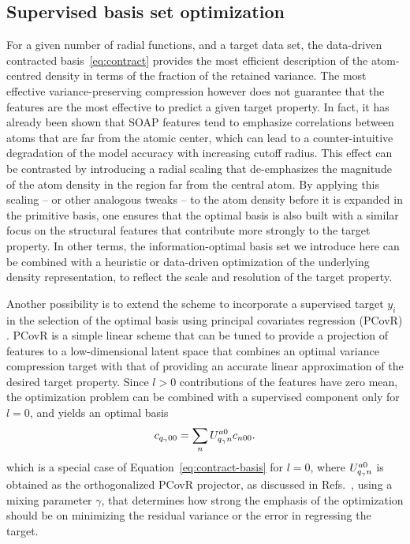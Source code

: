 \subsection{Supervised basis set optimization}
For a given number of radial functions, and a target data set, the data-driven contracted basis~\eqref{eq:contract} provides the most efficient description of the atom-centred density in terms of the fraction of the retained variance.
The most effective variance-preserving compression however does not guarantee that the features are the most effective to predict a given target property.
In fact, it has already been shown that SOAP features tend to emphasize correlations between atoms that are far from the atomic center, which can lead to a counter-intuitive degradation of the model accuracy with increasing cutoff radius\cite{bart+17sa,will+18pccp}. 
This effect can be contrasted by introducing a radial scaling\cite{huan-vonl16jcp,will+18pccp} that de-emphasizes the magnitude of the atom density in the region far from the central atom. 
By applying this scaling -- or other analogous tweaks\cite{caro2019optimizing} -- to the atom density before it is expanded in the primitive basis, one ensures that the optimal basis is also built with a similar focus on the structural features that contribute more strongly to the target property.
In other terms, the information-optimal basis set we introduce here can be combined with a heuristic or data-driven optimization of the underlying density representation, to reflect the scale and resolution of the target property.


Another possibility is to extend the scheme to incorporate a supervised target $y_i$ in the selection of the optimal basis using principal covariates regression (PCovR) \cite{dejo-kier92cils,helf+20mlst}.
PCovR is a simple linear scheme that can be tuned to provide a projection of features to a low-dimensional latent space that combines an optimal variance compression target with that of providing an accurate linear approximation of the desired target property. 
Since $l>0$ contributions of the features have zero mean, the optimization problem can be combined with a supervised component only for $l=0$, and yields an optimal basis
\begin{equation}
  c_{q_\gamma00} = \sum_n U^{a0}_{q_\gamma n} c_{n00}.
\end{equation}
which is a special case of Equation~\eqref{eq:contract-basis} for $l=0$, 
where $U^{a0}_{q_\gamma n}$ is obtained as the orthogonalized PCovR projector, as discussed in Refs.~, using a mixing parameter $\gamma$, that determines how strong the emphasis of the optimization should be on minimizing the residual variance or the error in regressing the target.


